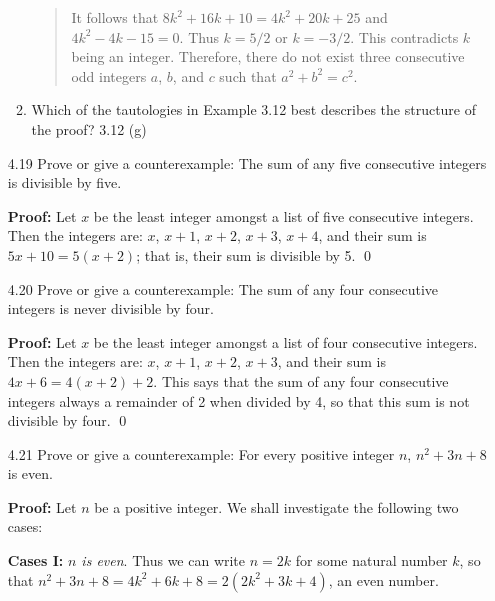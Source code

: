 \begin{enumerate}
\begin{enumerate}
\begin{quote}
                           \quad It follows that
                           $8k^2 + 16k + 10 = 4k^2 + 20k + 25$ and
                           $4k^2 - 4k - 15 = 0$. Thus $k = 5/2$ or $k = -3/2$.
                           This contradicts $k$ being an integer. Therefore,
                           there do not exist three consecutive odd integers
                           $a$, $b$, and $c$ such that $a^2 + b^2 = c^2$.
                        \end{quote}
                  \item Which of the tautologies in Example 3.12 best describes
                        the structure of the proof? 3.12 (g)
               \end{enumerate}
   \item[4.19] Prove or give a counterexample: The sum of any five consecutive
               integers is divisible by five.

      \textbf{Proof:} Let $x$ be the least integer amongst a list of five
      consecutive integers. Then the integers are: $x$, $x + 1$, $x + 2$,
      $x + 3$, $x + 4$, and their sum is $5x + 10 = 5(x + 2)$; that is, their
      sum is divisible by 5. \qed
   \item[4.20] Prove or give a counterexample: The sum of any four consecutive
               integers is never divisible by four.

      \textbf{Proof:} Let $x$ be the least integer amongst a list of four
      consecutive integers. Then the integers are: $x$, $x + 1$, $x + 2$,
      $x + 3$, and their sum is $4x + 6 = 4(x + 2) + 2$. This says that the
      sum of any four consecutive integers always a remainder of 2 when divided
      by 4, so that this sum is not divisible by four. \qed
   \item[4.21] Prove or give a counterexample: For every positive integer $n$,
               $n^2 + 3n + 8$ is even.

      \textbf{Proof:} Let $n$ be a positive integer. We shall investigate the
      following two cases:

      \textbf{Cases I:} \textit{$n$ is even}. Thus we can write $n = 2k$ for
      some natural number $k$, so that
      $n^2 + 3n + 8 = 4k^2 + 6k + 8 = 2(2k^2 + 3k + 4)$, an even number.


\end{enumerate}
